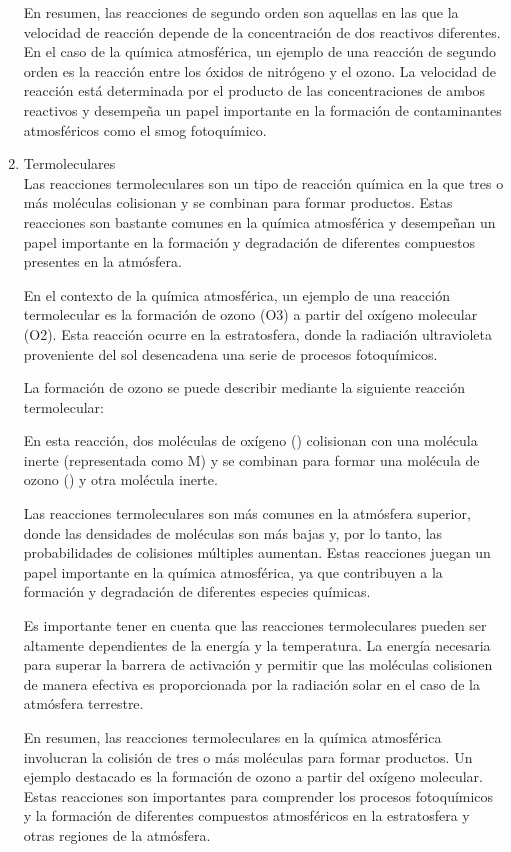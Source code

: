 \begin{enumerate}
En resumen, las reacciones de segundo orden son aquellas en las que la velocidad de reacción depende de la concentración de dos reactivos diferentes. En el caso de la química atmosférica, un ejemplo de una reacción de segundo orden es la reacción entre los óxidos de nitrógeno y el ozono. La velocidad de reacción está determinada por el producto de las concentraciones de ambos reactivos y desempeña un papel importante en la formación de contaminantes atmosféricos como el smog fotoquímico.

\item Termoleculares \\
Las reacciones termoleculares son un tipo de reacción química en la que tres o más moléculas colisionan y se combinan para formar productos. Estas reacciones son bastante comunes en la química atmosférica y desempeñan un papel importante en la formación y degradación de diferentes compuestos presentes en la atmósfera.

En el contexto de la química atmosférica, un ejemplo de una reacción termolecular es la formación de ozono (O3) a partir del oxígeno molecular (O2). Esta reacción ocurre en la estratosfera, donde la radiación ultravioleta proveniente del sol desencadena una serie de procesos fotoquímicos.

La formación de ozono se puede describir mediante la siguiente reacción termolecular:


En esta reacción, dos moléculas de oxígeno () colisionan con una molécula inerte (representada como M) y se combinan para formar una molécula de ozono () y otra molécula inerte.

Las reacciones termoleculares son más comunes en la atmósfera superior, donde las densidades de moléculas son más bajas y, por lo tanto, las probabilidades de colisiones múltiples aumentan. Estas reacciones juegan un papel importante en la química atmosférica, ya que contribuyen a la formación y degradación de diferentes especies químicas.

Es importante tener en cuenta que las reacciones termoleculares pueden ser altamente dependientes de la energía y la temperatura. La energía necesaria para superar la barrera de activación y permitir que las moléculas colisionen de manera efectiva es proporcionada por la radiación solar en el caso de la atmósfera terrestre.

En resumen, las reacciones termoleculares en la química atmosférica involucran la colisión de tres o más moléculas para formar productos. Un ejemplo destacado es la formación de ozono a partir del oxígeno molecular. Estas reacciones son importantes para comprender los procesos fotoquímicos y la formación de diferentes compuestos atmosféricos en la estratosfera y otras regiones de la atmósfera.



\end{enumerate}
